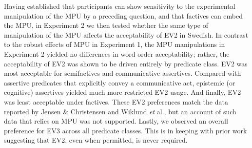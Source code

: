 \documentclass[output=paper]{LSP/langsci}
\begin{document}
Having established that participants can show sensitivity to the experimental manipulation of the MPU by a preceding question, and that factives can embed the MPU, in Experiment 2 we then tested whether the same type of manipulation of the MPU affects the acceptability of EV2 in Swedish. 
 In contrast to the robust effects of MPU in Experiment 1, the MPU manipulations in Experiment 2 yielded no differences in word order acceptability; rather, the acceptability of EV2 was shown to be driven entirely by predicate class.  EV2 was most acceptable for semifactives and communicative assertives.  Compared with assertive predicates that explicitly convey a communicative act, epistemic (or cognitive) assertives yielded much more restricted EV2 usage.  And finally, EV2 was least acceptable under factives.  These EV2 preferences match the data reported by Jensen \& Christensen and Wiklund \textit{et} al., but an account of such data that relies on MPU was not supported.  Lastly, we observed an overall preference for EV3 across all predicate classes. This is in keeping with prior work suggesting that EV2, even when permitted, is never required. 
\end{document}
